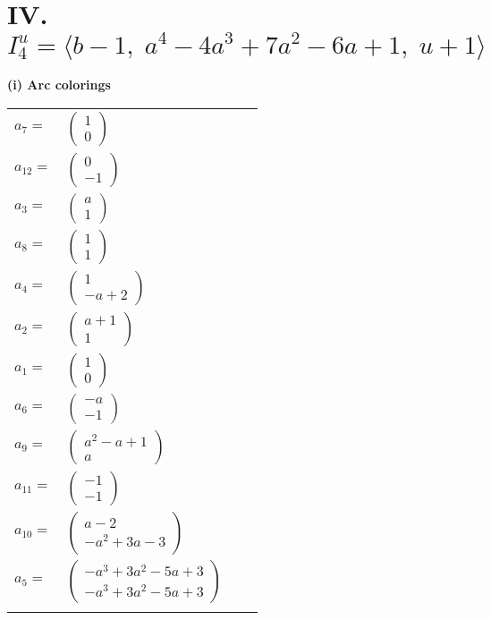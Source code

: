 \documentclass[1p]{elsarticle_modified}
\theoremstyle{definition}
\begin{document}
\centering \section*{IV. $I^u_{4}= \langle b-1,\;a^4-4 a^3+7 a^2-6 a+1,\;u+1 \rangle$}
\flushleft \textbf{(i) Arc colorings}\\
\begin{tabular}{m{7pt} m{180pt} m{7pt} m{180pt} }
\flushright $a_{7}=$&$\begin{pmatrix}1\\0\end{pmatrix}$ \\
\flushright $a_{12}=$&$\begin{pmatrix}0\\-1\end{pmatrix}$ \\
\flushright $a_{3}=$&$\begin{pmatrix}a\\1\end{pmatrix}$ \\
\flushright $a_{8}=$&$\begin{pmatrix}1\\1\end{pmatrix}$ \\
\flushright $a_{4}=$&$\begin{pmatrix}1\\- a+2\end{pmatrix}$ \\
\flushright $a_{2}=$&$\begin{pmatrix}a+1\\1\end{pmatrix}$ \\
\flushright $a_{1}=$&$\begin{pmatrix}1\\0\end{pmatrix}$ \\
\flushright $a_{6}=$&$\begin{pmatrix}- a\\-1\end{pmatrix}$ \\
\flushright $a_{9}=$&$\begin{pmatrix}a^2- a+1\\a\end{pmatrix}$ \\
\flushright $a_{11}=$&$\begin{pmatrix}-1\\-1\end{pmatrix}$ \\
\flushright $a_{10}=$&$\begin{pmatrix}a-2\\- a^2+3 a-3\end{pmatrix}$ \\
\flushright $a_{5}=$&$\begin{pmatrix}- a^3+3 a^2-5 a+3\\- a^3+3 a^2-5 a+3\end{pmatrix}$\\&\end{tabular}
\end{document}
